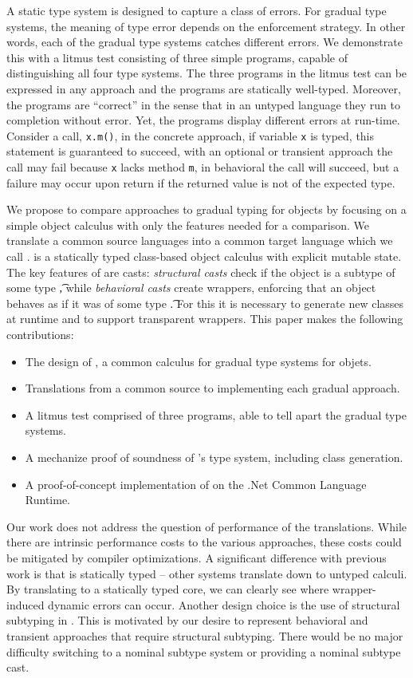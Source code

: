 \documentclass[USenglish]{tex/lipics-v2016}
\newcommand{\code}[1]{{\tt #1}\xspace}
\begin{document}
A static type system is designed to capture a class of errors. For gradual
type systems, the meaning of type error depends on the enforcement strategy.
In other words, each of the gradual type systems catches different errors.
We demonstrate this with a litmus test consisting of three simple programs,
capable of distinguishing all four type systems. The three programs in the
litmus test can be expressed in any approach and the programs are statically
well-typed.  Moreover, the programs are ``correct'' in the sense that in an
untyped language they run to completion without error. Yet, the programs
display different errors at run-time. Consider a call, \code{x.m()}, in the
concrete approach, if variable \code x is typed, this statement is
guaranteed to succeed, with an optional or transient approach the call may
fail because \code{x} lacks method \code{m}, in behavioral the call will
succeed, but a failure may occur upon return if the returned value is not of
the expected type.

We propose to compare approaches to gradual typing for objects by focusing
on a simple object calculus with only the features needed for a comparison.
We translate a common source languages into a common target language which
we call \kafka.  \kafka is a statically typed class-based object calculus
with explicit mutable state. The key features of \kafka are casts:
\emph{structural casts} check if the object is a subtype of some type \t,
while \emph{behavioral casts} create wrappers, enforcing that an object
behaves as if it was of some type \t. For this it is necessary to generate
new classes at runtime and to support transparent wrappers.  This paper
makes the following contributions:
\begin{itemize}  
  \item The design of \kafka, a common calculus for gradual type systems for
    objets.
\item Translations from a common source to \kafka implementing each gradual
  approach.
\item A litmus test comprised of three programs, able to tell apart the
  gradual type systems.
\item A mechanize proof of soundness of \kafka's type system, including
  class generation.
\item A proof-of-concept implementation of \kafka on the .Net Common
  Language Runtime.
\end{itemize}

\noindent Our work does not address the question of performance of the
translations. While there are intrinsic performance costs to the various
approaches, these costs could be mitigated by compiler optimizations.  A
significant difference with previous work is that \kafka is statically typed
-- other systems translate down to untyped calculi.  By translating to a
statically typed core, we can clearly see where wrapper-induced dynamic
errors can occur. Another design choice is the use of structural subtyping
in \kafka. This is motivated by our desire to represent behavioral and
transient approaches that require structural subtyping.  There would be no
major difficulty switching \kafka to a nominal subtype system or providing a
nominal subtype cast.
\end{document}
